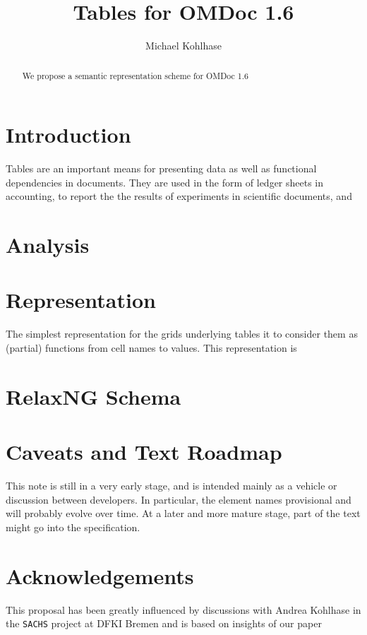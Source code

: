 \documentclass[12pt]{article}
\title{Tables for OMDoc 1.6}
\author{Michael Kohlhase}
\begin{document}
\maketitle
\begin{abstract}
  We propose a semantic representation scheme for OMDoc 1.6
\end{abstract}

\section{Introduction}

Tables are an important means for presenting data as well as functional dependencies in
documents. They are used in the form of ledger sheets in accounting, to report the the
results of experiments in scientific documents, and

\section{Analysis}

\section{Representation}

The simplest representation for the grids underlying tables it to consider them as
(partial) functions from cell names to values. This representation is 

\section{RelaxNG Schema}
  

\section{Caveats and Text Roadmap}

This note is still in a very early stage, and is intended mainly as a vehicle or
discussion between {\omdoc} developers. In particular, the element names provisional and
will probably evolve over time. At a later and more mature stage, part of the text might
go into the {\omdoc} specification.

\section{Acknowledgements}
This proposal has been greatly influenced by discussions with Andrea Kohlhase in the
{\tt{SACHS}} project at DFKI Bremen and is based on insights of our
paper~\cite{KohKoh:csbs08}

 

\end{document}
